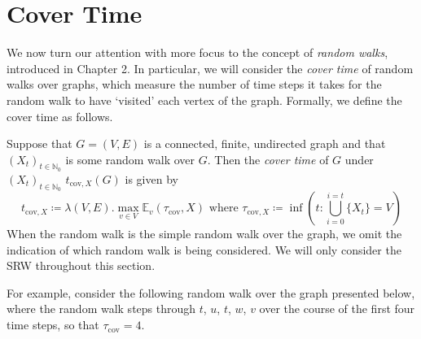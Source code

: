 \section{Cover Time}
	We now turn our attention with more focus to the concept of \emph{random walks}, introduced
	in Chapter 2. In particular, we will consider the \emph{cover time} of random walks over
	graphs, which measure the number of time steps it takes for the random walk to have 
	`visited' each vertex of the graph. Formally, we define the cover time as follows.
	\begin{definition}
		Suppose that $G = (V, E)$ is a connected, finite, undirected graph and that 
		$(X_t)_{t\in\mathbb{N}_0}$ is some random walk over $G$. Then the \emph{cover 
		time} of $G$ under $(X_t)_{t\in\mathbb{N}_0}$ $t_{\mathrm{cov}, X}(G)$ is given by 
		$$
			t_{\mathrm{cov}, X}\coloneqq \lambda (V, E) .
			\max_{v\in V}\mathbb{E}_v(\tau_\mathrm{cov},X)
			\text{\ \ \ where\ \ \ }
		      \tau_{\mathrm{cov},X}\coloneqq\inf\left(t:\bigcup_{i=0}^{i=t}\{X_t\}=V\right)
		$$
		When the random walk is the simple random walk over the graph, we omit the 
		indication of which random walk is being considered. We will only consider the 
		SRW throughout this section.
	\end{definition}
	For example, consider the following random walk over the graph presented below, where
	the random walk steps through $t$, $u$, $t$, $w$, $v$ over the course of the first four 
	time steps, so that $\tau_\mathrm{cov} = 4$. 
	\begin{center}
	\end{center}

